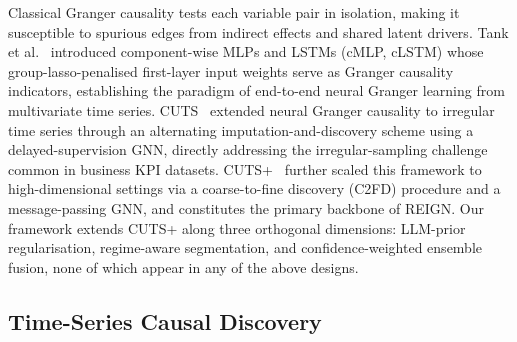 Classical Granger causality tests each variable pair in isolation,
making it susceptible to spurious edges from indirect effects and shared
latent drivers.
Tank et al.~\cite{Tank2022} introduced component-wise MLPs and LSTMs
(cMLP, cLSTM) whose group-lasso-penalised first-layer input weights
serve as Granger causality indicators, establishing the paradigm of
end-to-end neural Granger learning from multivariate time series.
CUTS~\cite{Cheng2023} extended neural Granger causality to irregular time
series through an alternating imputation-and-discovery scheme using a
delayed-supervision GNN, directly addressing the irregular-sampling
challenge common in business KPI datasets.
CUTS+~\cite{Cheng2024} further scaled this framework to
high-dimensional settings via a coarse-to-fine discovery (C2FD) procedure
and a message-passing GNN, and constitutes the primary backbone of REIGN.
Our framework extends CUTS+ along three orthogonal dimensions:
LLM-prior regularisation, regime-aware segmentation, and
confidence-weighted ensemble fusion, none of which appear in any of
the above designs.

\subsection{Time-Series Causal Discovery}


